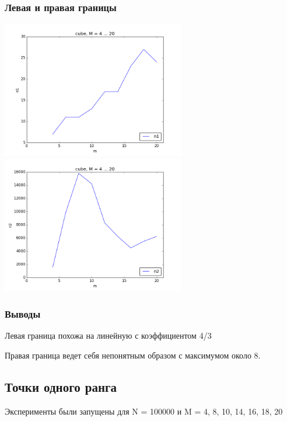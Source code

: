 \subsubsection{Левая и правая границы}
\begin{center}
\includegraphics[width = 8cm]{pic/cube_n1-}
\includegraphics[width = 8cm]{pic/cube_n2-}
\end{center}

\subsubsection{Выводы}
Левая граница похожа на линейную с коэффициентом 4/3

Правая граница ведет себя непонятным образом с максимумом около 8. 


\subsection{Точки одного ранга}
Эксперименты были запущены для N = 100000 и M = {4, 8, 10, 14, 16, 18, 20}

